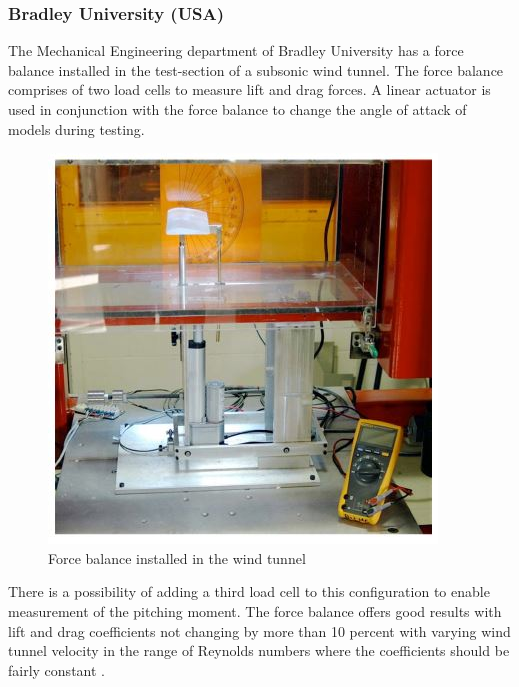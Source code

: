 \subsubsection{Bradley University (USA)}
The Mechanical Engineering department of Bradley University has a force balance installed in the test-section of a subsonic wind tunnel. The force balance comprises of two load cells to measure lift and drag forces. A linear actuator is used in conjunction with the force balance to change the angle of attack of models during testing.
\begin{center}
	\begin{figure}[H]
	\centering
	\includegraphics[width=0.6\linewidth]{Figures/force}
	\caption[Force balance installed]{Force balance installed in the wind tunnel \cite{morris_force_2010}}
	\end{figure}
\end{center}
There is a possibility of adding a third load cell to this configuration to enable measurement of the pitching moment. The force balance offers good results with lift and drag coefficients not changing by more than 10 percent with varying wind tunnel velocity in the range of Reynolds
numbers where the coefficients should be fairly constant \cite{morris_force_2010}.

